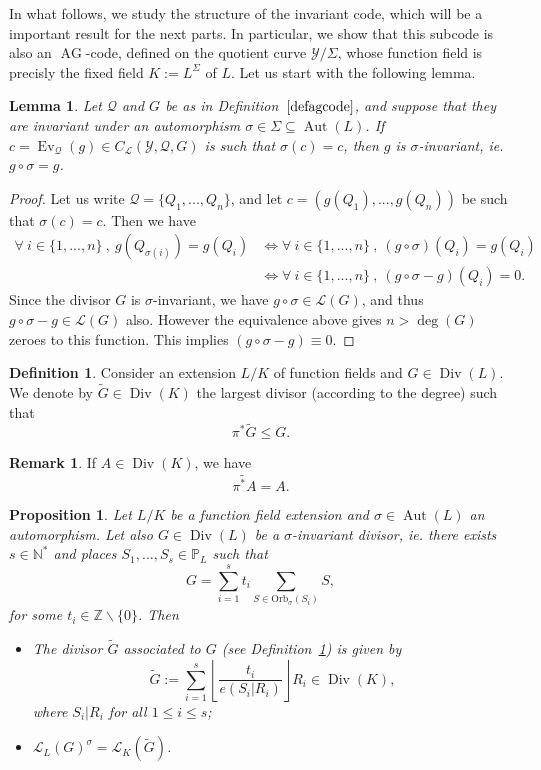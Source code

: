 \documentclass[10pt]{article}
\newtheorem{prop1}[thm]{Proposition}
\newtheorem{lem1}[thm]{Lemma}
\theoremstyle{definition}
\newtheorem{rq1}[thm]{Remark}
\theoremstyle{definition}
\theoremstyle{definition}
\newtheorem{def1}[thm]{Definition}
\newcommand{\N}{\mathbb{N}}
\newcommand{\Z}{\mathbb{Z}}
\newcommand{\PP}{\mathbb{P}}
\newcommand{\su}{\subseteq}
\newcommand{\Y}{\mathcal{Y}}
\newcommand{\QR}{\mathcal{Q}}
\newcommand{\Div}{\operatorname{Div}}
\newcommand{\Aut}{\operatorname{Aut}}
\newcommand{\ag}{\operatorname{AG}}
\newcommand{\calL}{\mathcal{L}}
\begin{document}
In what follows, we study the structure of the invariant code, which will be a important result for the next parts. In particular, we show that this subcode is also an $\ag$-code, defined on the quotient curve $\Y/\Sigma$, whose function field is precisly the fixed field $K:=L^{\Sigma}$ of $L$. Let us start with the following lemma.

\begin{lem1} \label{inv}
Let $\QR$ and $G$ be as in Definition~$\ref{defagcode}$, and suppose that they are invariant under an automorphism $\sigma \in \Sigma \su \Aut(L)$. If $c = \operatorname{Ev}_{\QR}(g) \in C_{\calL}(\Y,\QR,G)$ is such that $\sigma(c) = c$, then $g$ is $\sigma$-invariant, ie. $g\circ \sigma = g$. 
\end{lem1}

\begin{proof}
Let us write $\QR = \{Q_1,...,Q_n\}$, and let $c=(g(Q_1),...,g(Q_n))$ be such that $\sigma(c)=c$. Then we have 
\begin{align*}
\forall \ i \in \{1,...,n\} \ , \ g(Q_{\sigma(i)}) = g(Q_i) &\iff \forall \ i \in \{1,...,n\} \ , \ (g \circ \sigma)(Q_i) =g(Q_i) \\
& \iff \forall \ i \in \{1,...,n\} \ , \ (g\circ \sigma - g)(Q_i) = 0.
\end{align*}
Since the divisor $G$ is $\sigma$-invariant, we have $g \circ \sigma \in \calL(G)$, and thus $g\circ \sigma - g \in \calL(G)$ also.
However the equivalence above gives $n>\deg(G)$ zeroes to this function. This implies $(g \circ \sigma - g) \equiv 0$.
\end{proof}

\begin{def1} \label{pousseavant}
Consider an extension $L/K$ of function fields and $G \in \Div(L)$. We denote by $\tilde{G} \in \Div(K)$ the largest divisor (according to the degree) such that
\[\pi^*\tilde{G} \leq G.\]
\end{def1} 
 
\begin{rq1} \label{jsp}
If $A \in \Div(K)$, we have 
\[\widetilde{\pi^*A}=A.\]
\end{rq1}

\begin{prop1} \label{invrr}
Let $L/K$ be a function field extension and $\sigma \in \Aut(L)$ an automorphism. Let also $G \in \Div(L)$ be a $\sigma$-invariant divisor, \textit{ie.} there exists $s \in \N^*$ and places $S_1,...,S_s \in \PP_L$ such that 
\[G = \sum\limits_{i=1}^s t_i \sum\limits_{S \in \mathrm{Orb}_{\sigma}(S_i)} S,\]
for some $t_i \in \Z \backslash \{0\}$. Then
\begin{itemize}
\item[(i)] The divisor $\tilde{G}$ associated to $G$ (see Definition~\ref{pousseavant}) is given by
\[\tilde{G}:= \sum\limits_{i=1}^s \left\lfloor\dfrac{t_i}{e(S_i|R_i)}\right\rfloor  R_i \in \Div(K),\]
where $S_i|R_i$ for all $1 \leq i \leq s$;
\item[(ii)]  $\calL_L(G)^{\sigma} = \calL_K(\tilde{G})$.
\end{itemize}
\end{prop1}
\end{document}

